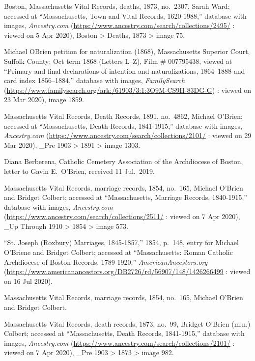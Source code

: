 \begin{thebibliography}{999}
Boston, Massachusetts Vital Records, deaths, 1873, no.\ 2307, Sarah Ward; accessed at ``Massachusetts, Town and Vital Records, 1620-1988,'' database with images, \textit{Ancestry.com} (\url{https://www.ancestry.com/search/collections/2495/} : viewed on 5 Apr 2020), Boston > Deaths, 1873 > image 75.


Michael OBrien petition for naturalization (1868), 
Massachusetts Superior Court, Suffolk County; 
Oct term 1868 (Letters L--Z), Film \# 007795438,
viewed at ``Primary and final declarations of intention and naturalizations, 1864--1888 and card index 1856--1884,''
database with images, \textit{FamilySearch} (\url{https://www.familysearch.org/ark:/61903/3:1:3Q9M-CS9H-83DG-G}) : viewed on 23 Mar 2020), image 1859.

Massachusetts Vital Records, Death Records, 1891, no.\ 4862, Michael O'Brien; accessed at ``Massachusetts, Death Records, 1841-1915,'' database with images, \textit{Ancestry.com} (\url{https://www.ancestry.com/search/collections/2101/} : viewed on 29 Mar 2020), \_Pre 1903 > 1891 > image 1303.

Diana Berberena, Catholic Cemetery Association of the Archdiocese of Boston, letter to Gavin E.\ O'Brien, received 11 Jul.\ 2019.

Massachusetts Vital Records, marriage records, 1854, no.\ 165, Michael O'Brien and Bridget Colbert; accessed at ``Massachusetts, Marriage Records, 1840-1915,'' database with images, \textit{Ancestry.com} (\url{https://www.ancestry.com/search/collections/2511/} : viewed on 7 Apr 2020), \_Up Through 1910 > 1854 > image 573.

``St. Joseph (Roxbury) Marriages, 1845-1857,'' 1854, p.\ 148, entry for Michael O'Briene and Bridget Colbert; accessed at ``Massachusetts: Roman Catholic Archdiocese of Boston Records, 1789-1920,'' \textit{AmericanAncestors.org} (\url{https://www.americanancestors.org/DB2726/rd/56907/148/1426266499} : viewed on 16 Jul 2020).

Massachusetts Vital Records, marriage records, 1854, no.\ 165, Michael O'Brien and Bridget Colbert.

Massachusetts Vital Records, death records, 1873, no.\ 99, Bridget O'Brien (m.n.) Colbert; accessed at ``Massachusetts, Death Records, 1841-1915,'' database with images, \textit{Ancestry.com} (\url{https://www.ancestry.com/search/collections/2101/} : viewed on 7 Apr 2020), \_Pre 1903 > 1873 > image 982.


\end{thebibliography}
